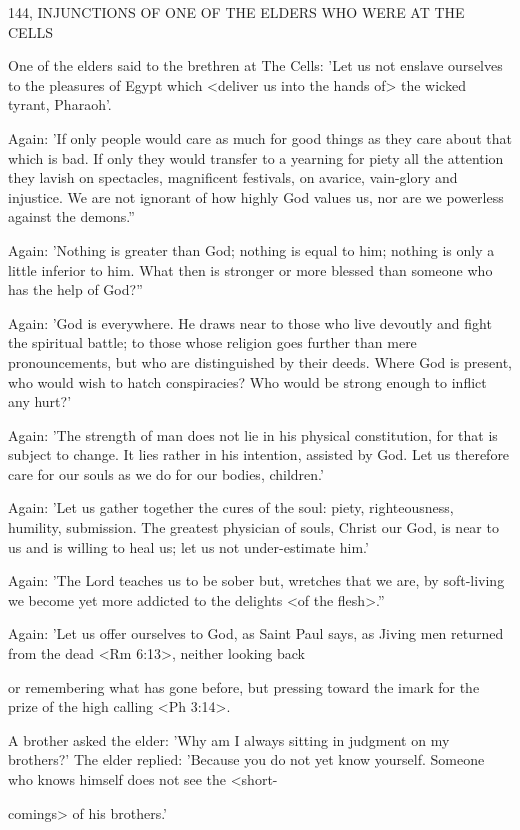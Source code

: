 144, INJUNCTIONS OF ONE OF THE ELDERS
WHO WERE AT THE CELLS

One of the elders said to the brethren at The Cells: 'Let us not
enslave ourselves to the pleasures of Egypt which <deliver us into
the hands of> the wicked tyrant, Pharaoh'.

Again: 'If only people would care as much for good things as
they care about that which is bad.
If only they would transfer to a
yearning for piety all the attention they lavish on spectacles,
magnificent festivals, on avarice, vain-glory and injustice.
We are
not ignorant of how highly God values us, nor are we powerless
against the demons.”

Again: 'Nothing is greater than God; nothing is equal to him;
nothing is only a little inferior to him.
What then is stronger or
more blessed than someone who has the help of God?”

Again: 'God is everywhere.
He draws near to those who live
devoutly and fight the spiritual battle; to those whose religion goes
further than mere pronouncements, but who are distinguished by
their deeds.
Where God is present, who would wish to hatch
conspiracies? Who would be strong enough to inflict any hurt?'

Again: 'The strength of man does not lie in his physical
constitution, for that is subject to change.
It lies rather in his
intention, assisted by God.
Let us therefore care for our souls as we
do for our bodies, children.'

Again: 'Let us gather together the cures of the soul: piety,
righteousness, humility, submission.
The greatest physician of souls,
Christ our God, is near to us and is willing to heal us; let us not
under-estimate him.'

Again: 'The Lord teaches us to be sober but, wretches that we
are, by soft-living we become yet more addicted to the delights <of
the flesh>.”

Again: 'Let us offer ourselves to God, as Saint Paul says, as
Jiving men returned from the dead <Rm 6:13>, neither looking back

or remembering what has gone before, but pressing toward the
imark for the prize of the high calling <Ph 3:14>.

A brother asked the elder: 'Why am I always sitting in judgment
on my brothers?' The elder replied: 'Because you do not yet know
yourself.
Someone who knows himself does not see the <short-

comings> of his brothers.'

